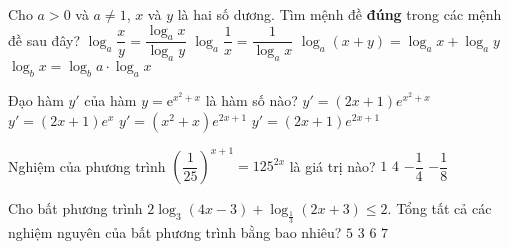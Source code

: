 \begin{ex}%
	Cho $a>0$ và $a\ne1$, $x$ và $y$ là hai số dương. Tìm mệnh đề \textbf{đúng} trong các mệnh đề sau đây?
	\choice
	{$ \log _a \dfrac{x}{y}=\dfrac{\log_ax}{\log_ay}$}
	{$ \log_a\dfrac{1}{x}=\dfrac{1}{\log_ax} $}
	{$ \log_a(x+y)=\log_ax+\log_ay $}
	{\True $ \log_bx=\log_ba\cdot\log_ax $}
\end{ex}
\begin{ex}%
	Đạo hàm $y'$ của hàm $y=\mathrm{e}^{x^2+x}$ là hàm số nào?
	\choice
	{\True $ y'=(2x+1)e^{x^2+x} $}
	{$ y'=(2x+1)e^x $}
	{$ y'=(x^2+x)e^{2x+1} $}
	{$ y'=(2x+1)e^{2x+1} $}
\end{ex}
\begin{ex}%
	Nghiệm của phương trình $ \left( \dfrac{1}{25}\right)^{x+1}=125^{2x}  $ là giá trị nào?
	\choice
	{$ 1 $}
	{$ 4 $}
	{\True$ -\dfrac{1}{4} $}
	{$ -\dfrac{1}{8} $}
\end{ex}
\begin{ex}%
Cho bất phương trình $2\log_3(4x-3)+\log_{\tfrac{1}{3}}(2x+3)\le2$. Tổng tất cả các nghiệm nguyên của bất phương trình bằng bao nhiêu?
	\choice
	{$ 5 $}
	{ $ 3 $}
	{\True $ 6 $}
	{$ 7 $}
\end{ex}
